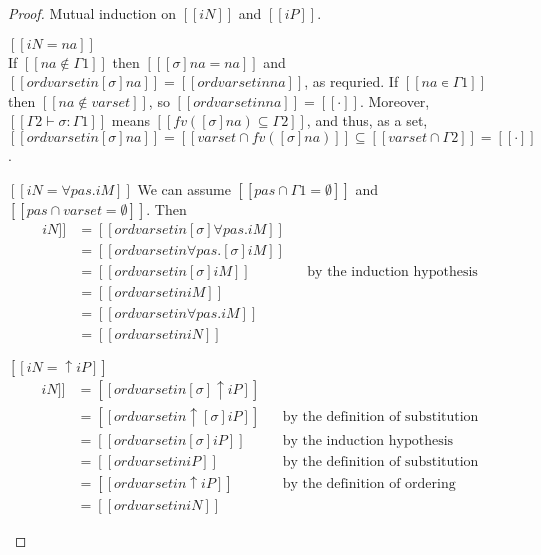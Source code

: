 \lemOrdSigma*
\begin{proof}
  Mutual induction on $[[iN]]$ and $[[iP]]$.
  \begin{caseof}
    \item $[[iN = na]]$ \\
      If $[[na ∉ Γ1]]$ then $[[ [σ]na = na ]]$ and $[[ ord varset in [σ]na ]] = [[ ord varset in na ]]$, 
      as requried.
      If $[[na ∊ Γ1]]$ then $[[na ∉ varset]]$, so $[[ ord varset in na ]] = [[·]]$.
      Moreover, $[[Γ2 ⊢ σ : Γ1]]$ means $[[ fv([σ]na) ⊆ Γ2 ]]$, and thus, 
      as a set, $[[ ord varset in [σ]na ]] = [[varset ∩ fv([σ]na)]] \subseteq [[varset ∩ Γ2]] = [[·]]$.
    \item $[[iN = ∀pas.iM]]$
      We can assume $[[{pas} ∩ Γ1 = ∅]]$
      and $[[{pas} ∩ varset = ∅]]$. Then 
      \begin{align*}[t]
         [[ ord varset in [σ]iN ]] &= [[ ord varset in [σ]∀pas.iM ]] \\
                                   &= [[ ord varset in ∀pas.[σ]iM ]]\\
                                   &= [[ ord varset in [σ]iM ]]
                                   && \text{by the induction hypothesis}\\
                                   &= [[ ord varset in iM ]]\\
                                   &= [[ ord varset in ∀pas.iM ]]\\
                                   &= [[ ord varset in iN ]]
       \end{align*}
    \item $[[iN = ↑iP]]$
       \begin{align*}[t]
        [[ ord varset in [σ]iN ]] &= [[ ord varset in [σ]↑iP ]] \\
                                   &= [[ ord varset in ↑[σ]iP ]]
                                   && \text{by the definition of substitution}\\
                                   &= [[ ord varset in [σ]iP ]]
                                   && \text{by the induction hypothesis}\\
                                   &= [[ ord varset in iP ]]
                                   && \text{by the definition of substitution}\\
                                   &= [[ ord varset in ↑iP ]]
                                   && \text{by the definition of ordering}\\
                                   &= [[ ord varset in iN ]]
       \end{align*}


\end{caseof}
\end{proof}
